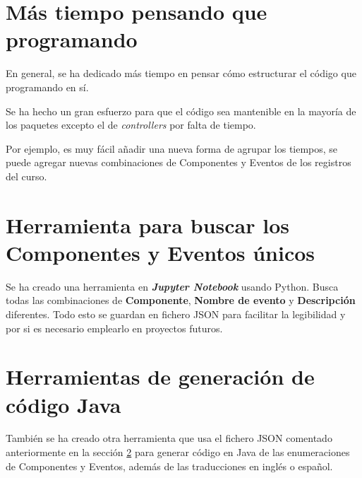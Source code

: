 

\section{Más tiempo pensando que programando}

En general, se ha dedicado más tiempo en pensar cómo estructurar el código que programando en sí. 

Se ha hecho un gran esfuerzo para que el código sea mantenible en la mayoría de los paquetes excepto el de \textit{controllers} por falta de tiempo.

Por ejemplo, es muy fácil añadir una nueva forma de agrupar los tiempos,
se puede agregar nuevas combinaciones de Componentes y Eventos de los registros del curso.

\section{Herramienta para buscar los Componentes y Eventos únicos}\label{sec:componeteyevento}

Se ha creado una herramienta en \textbf{\textit{Jupyter Notebook}} usando Python. Busca todas las combinaciones de \textbf{Componente}, \textbf{Nombre de evento} y \textbf{Descripción} diferentes. Todo esto se guardan en fichero JSON para facilitar la legibilidad y por si es necesario emplearlo en proyectos futuros.


\section{Herramientas de generación de código Java}

También se ha creado otra herramienta que usa el fichero JSON comentado anteriormente en la sección \ref{sec:componeteyevento} para generar código en Java de las enumeraciones de Componentes y Eventos, además de las traducciones en inglés o español.
